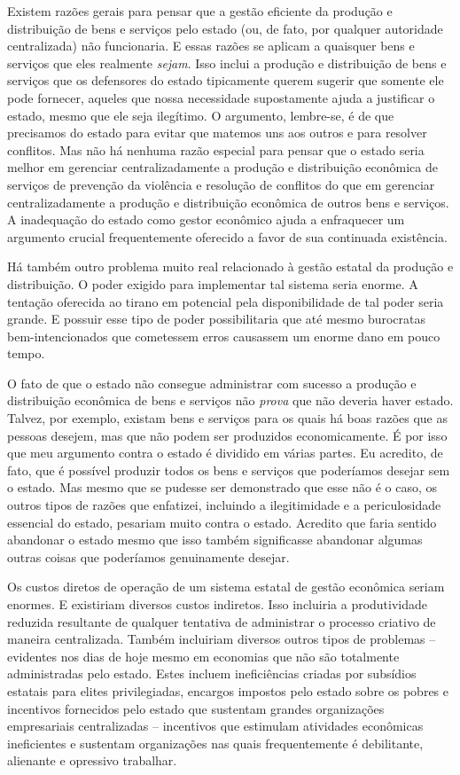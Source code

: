 Existem razões gerais para pensar que a gestão eficiente da produção e distribuição de bens e serviços pelo estado (ou, de fato, por qualquer autoridade centralizada) não funcionaria. E essas razões se aplicam a quaisquer bens e serviços que eles realmente \emph{sejam}. Isso inclui a produção e distribuição de bens e serviços que os defensores do estado tipicamente querem sugerir que somente ele pode fornecer, aqueles que nossa necessidade supostamente ajuda a justificar o estado, mesmo que ele seja ilegítimo. O argumento, lembre-se, é de que precisamos do estado para evitar que matemos uns aos outros e para resolver conflitos. Mas não há nenhuma razão especial para pensar que o estado seria melhor em gerenciar centralizadamente a produção e distribuição econômica de serviços de prevenção da violência e resolução de conflitos do que em gerenciar centralizadamente a produção e distribuição econômica de outros bens e serviços. A inadequação do estado como gestor econômico ajuda a enfraquecer um argumento crucial frequentemente oferecido a favor de sua continuada existência.

Há também outro problema muito real relacionado à gestão estatal da produção e distribuição. O poder exigido para implementar tal sistema seria enorme. A tentação oferecida ao tirano em potencial pela disponibilidade de tal poder seria grande. E possuir esse tipo de poder possibilitaria que até mesmo burocratas bem-intencionados que cometessem erros causassem um enorme dano em pouco tempo.

O fato de que o estado não consegue administrar com sucesso a produção e distribuição econômica de bens e serviços não \emph{prova} que não deveria haver estado. Talvez, por exemplo, existam bens e serviços para os quais há boas razões que as pessoas desejem, mas que não podem ser produzidos economicamente. É por isso que meu argumento contra o estado é dividido em várias partes. Eu acredito, de fato, que é possível produzir todos os bens e serviços que poderíamos desejar sem o estado. Mas mesmo que se pudesse ser demonstrado que esse não é o caso, os outros tipos de razões que enfatizei, incluindo a ilegitimidade e a periculosidade essencial do estado, pesariam muito contra o estado. Acredito que faria sentido abandonar o estado mesmo que isso também significasse abandonar algumas outras coisas que poderíamos genuinamente desejar.

Os custos diretos de operação de um sistema estatal de gestão econômica seriam enormes. E existiriam diversos custos indiretos. Isso incluiria a produtividade reduzida resultante de qualquer tentativa de administrar o processo criativo de maneira centralizada. Também incluiriam diversos outros tipos de problemas -- evidentes nos dias de hoje mesmo em economias que não são totalmente administradas pelo estado. Estes incluem ineficiências criadas por subsídios estatais para elites privilegiadas, encargos impostos pelo estado sobre os pobres e incentivos fornecidos pelo estado que sustentam grandes organizações empresariais centralizadas -- incentivos que estimulam atividades econômicas ineficientes e sustentam organizações nas quais frequentemente é debilitante, alienante e opressivo trabalhar.

